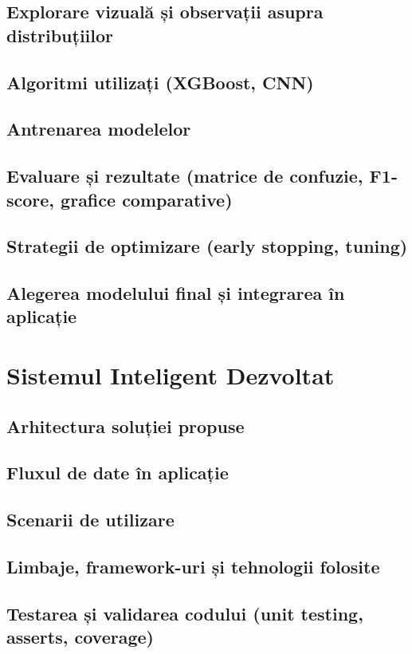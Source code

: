 \documentclass[runningheads,a4paper,11pt,twoside]{report}
\begin{document}
\section{Explorare vizuală și observații asupra distribuțiilor}
\section{Algoritmi utilizați (XGBoost, CNN)}
\section{Antrenarea modelelor}
\section{Evaluare și rezultate (matrice de confuzie, F1-score, grafice comparative)}
\section{Strategii de optimizare (early stopping, tuning)}
\section{Alegerea modelului final și integrarea în aplicație}

\chapter{Sistemul Inteligent Dezvoltat}
\section{Arhitectura soluției propuse}
\section{Fluxul de date în aplicație}
\section{Scenarii de utilizare}
\section{Limbaje, framework-uri și tehnologii folosite}
\section{Testarea și validarea codului (unit testing, asserts, coverage)}
\end{document}
